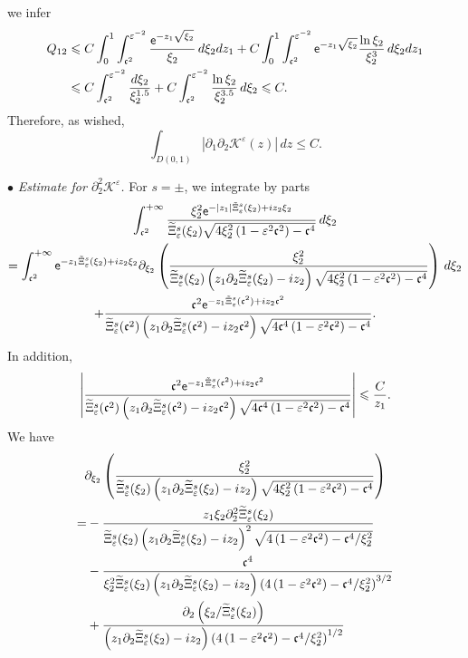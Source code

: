 \documentclass[10pt]{amsart}
\theoremstyle{definition}\newtheorem{defi}[theo]{Definition}\newtheorem{rema}[theo]{Remark}\newtheorem{exam}[theo]{Example}\newtheorem{exem}[theo]{Example}\newtheorem{nota}[theo]{Notation}
\newcommand*\p{\partial}
\newcommand*\BK{\mathcal{K}}
\newcommand*\ex{{\sf e}}
\newcommand*\cs{{\mathfrak c}}
\newcommand*\ii{\infty}
\newcommand*\ls{\leqslant }
\newcommand*\e{\varepsilon}
\renewcommand*\t{\tilde}
\let\oldtilde\tilde
\renewcommand*{\tilde}[1]{\mathchoice{\widetilde{#1}}{\widetilde{#1}}{\oldtilde{#1}}{\oldtilde{#1}}}
\begin{document}
we infer
\begin{align*}
Q_{12} & \ls C \int_{0}^1 \int_{\cs^2}^{\e^{-2}} \frac{ \ex^{ - z_1 \sqrt{\xi_2 } } }{ \xi_2 } \, d\xi_2 dz_1 + C \int_{0}^1 \int_{\cs^2}^{\e^{-2}} \ex^{ - z_1 \sqrt{\xi_2 } } \frac{\ln \xi_2}{\xi_2^3} \, d\xi_2 dz_1
\\ & \ls C \int_{\cs^2}^{\e^{-2}} \frac{ d\xi_2 }{ \xi_2^{1.5} } + C \int_{\cs^2}^{\e^{-2}} \frac{\ln \xi_2}{\xi_2^{3.5}} \, d\xi_2
\ls C.
\end{align*}
Therefore, as wished,
\[
\int_{D(0,1)} \left\lvert \p_1 \p_2 \BK^\e (z) \right\rvert \, dz \ls C.
\]


\noindent $ \bullet $ \emph{Estimate for $ \p_2^2 \BK^\e $.} For $ s = \pm $, we integrate by parts
\begin{multline}\label{IPP_K22_zero}
\int_{ \cs^2}^{+\ii} \frac{ \xi_2^2 \ex^{- |z_1| \t\Xi_\e^s (\xi_2) + i z_2 \xi_2} }{
\t\Xi_\e^s (\xi_2) \sqrt{ 4 \xi_2^2 \left(1 - \e^2 \cs^2\right) - \cs^4}} \, d\xi_2\\  =
\int_{ \cs^2}^{+\ii} \ex^{- z_1 \t\Xi_\e^s (\xi_2) + i z_2 \xi_2 }
\p_{\xi_2} \left(\frac{ \xi_2^2 }{ \t\Xi_\e^s (\xi_2) \left(z_1 \p_2 \t\Xi_\e^s (\xi_2) - i z_2\right) \sqrt{ 4 \xi_2^2 \left(1 - \e^2 \cs^2\right) - \cs^4 } } \right) \, d\xi_2 \\
+ \frac{ \cs^2 \ex^{- z_1 \t\Xi_\e^s (\cs^2) + i z_2 \cs^2 } }{ \t\Xi_\e^s (\cs^2) \left(z_1 \p_2 \t\Xi_\e^s (\cs^2) - i z_2 \cs^2\right) \sqrt{ 4 \cs^4 \left(1 - \e^2 \cs^2\right) - \cs^4 } }.
\end{multline}
In addition,
\[
\left\lvert
\frac{ \cs^2 \ex^{- z_1 \t\Xi_\e^s (\cs^2) + i z_2 \cs^2} }{ \t\Xi_\e^s (\cs^2) \left(z_1 \p_2 \t\Xi_\e^s (\cs^2) - i z_2 \cs^2\right)
\sqrt{ 4 \cs^4 \left(1 - \e^2 \cs^2\right) - \cs^4 } } \right\rvert
\ls \frac{C}{z_1 }.
\]
We have
\begin{multline*}
\p_{\xi_2} \left(\frac{ \xi_2^2 }{ \t\Xi_\e^s (\xi_2) \left(z_1 \p_2 \t\Xi_\e^s (\xi_2) - i z_2\right) \sqrt{ 4 \xi_2^2 \left(1 - \e^2 \cs^2\right) - \cs^4 } } \right)\\ 
\begin{aligned}
 =& - \frac{ z_1 \xi_2 \p_2^2 \t\Xi_\e^s (\xi_2) }{ \t\Xi_\e^s (\xi_2) \left(z_1 \p_2 \t\Xi_\e^s (\xi_2) - i z_2\right)^2 \sqrt{ 4 \left(1 - \e^2 \cs^2\right) - \cs^4 / \xi_2^2} }\\
&- \frac{ \cs^4 }{ \xi_2^2 \t\Xi_\e^s (\xi_2) \left(z_1 \p_2 \t\Xi_\e^s (\xi_2) - i z_2\right) \left(4 \left(1 - \e^2 \cs^2\right) - \cs^4 /\xi_2^2\right)^{3/2} }\\ 
&+ \frac{ \p_2 \left(\xi_2 / \t\Xi_\e^s (\xi_2)\right) }{\left(z_1 \p_2 \t\Xi_\e^s (\xi_2) - i z_2\right) \left(4 \left(1 - \e^2 \cs^2\right) - \cs^4 /\xi_2^2\right)^{1/2} }
\end{aligned}
\end{multline*}
\end{document}
